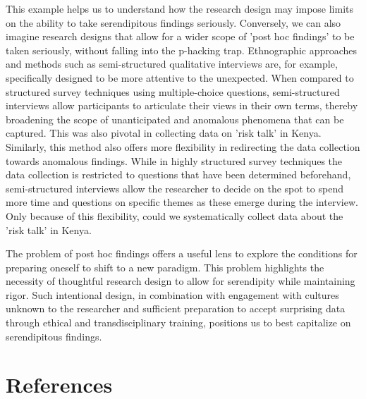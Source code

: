 \documentclass[authordate, commentary]{jote-new-article}
\begin{document}
	This example helps us to understand how the research design may impose limits on the ability to take serendipitous findings seriously. Conversely, we can also imagine research designs that allow for a wider scope of 'post hoc findings' to be taken seriously, without falling into the p-hacking trap. Ethnographic approaches and methods such as semi-structured qualitative interviews are, for example, specifically designed to be more attentive to the unexpected. When compared to structured survey techniques using multiple-choice questions, semi-structured interviews allow participants to articulate their views in their own terms, thereby broadening the scope of unanticipated and anomalous phenomena that can be captured. This was also pivotal in collecting data on 'risk talk' in Kenya. Similarly, this method also offers more flexibility in redirecting the data collection towards anomalous findings. While in highly structured survey techniques the data collection is restricted to questions that have been determined beforehand, semi-structured interviews allow the researcher to decide on the spot to spend more time and questions on specific themes as these emerge during the interview. Only because of this flexibility, could we systematically collect data about the 'risk talk' in Kenya.


	The problem of post hoc findings offers a useful lens to explore the conditions for preparing oneself to shift to a new paradigm. This problem highlights the necessity of thoughtful research design to allow for serendipity while maintaining rigor. Such intentional design, in combination with engagement with cultures unknown to the researcher and sufficient preparation to accept surprising data through ethical and transdisciplinary training, positions us to best capitalize on serendipitous findings.






	\section{References}
\end{document}
